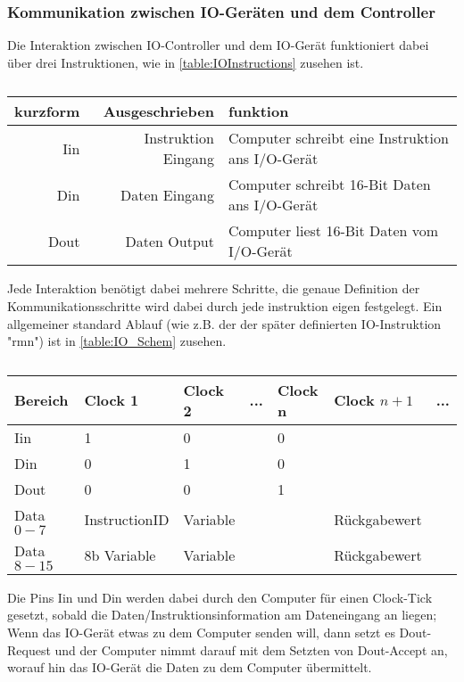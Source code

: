 \documentclass{scrartcl}
\begin{document}
\subsubsection{\label{section:IO-Port}Kommunikation zwischen IO-Geräten und dem Controller}
Die Interaktion zwischen IO-Controller und dem IO-Gerät funktioniert dabei über drei Instruktionen, wie in \autoref{table:IOInstructions} zusehen ist.

\begin{center}
	\begin{table}[h]
		\caption{\label{table:IOInstructions}}
		\begin{tabular}{r | r | l}
			kurzform & Ausgeschrieben & funktion \\
			\hline
			Iin & Instruktion Eingang & Computer schreibt eine Instruktion ans I/O-Gerät \\
			Din & Daten Eingang & Computer schreibt 16-Bit Daten ans I/O-Gerät \\
			Dout &  Daten Output & Computer liest 16-Bit Daten vom I/O-Gerät
 		\end{tabular}
	\end{table}
\end{center}

Jede Interaktion benötigt dabei mehrere Schritte, die genaue Definition der Kommunikationsschritte wird dabei durch jede instruktion eigen festgelegt.
Ein allgemeiner standard Ablauf (wie z.B. der der später definierten IO-Instruktion "rmn") ist in \autoref{table:IO_Schem} zusehen.

\begin{center}
	\begin{table}[h]
		\caption{\label{table:IO_Schem}}
		\begin{tabular}{l | l | l | l | l | l | l}
			 Bereich & Clock 1 & Clock 2 & ... & Clock n & Clock $n+1$ & ... \\
			\hline
			Iin & 1 & 0 &   & 0 & \\
			Din & 0 & 1 &   & 0 & \\
			Dout & 0 & 0 &   & 1 & \\
			Data$0-7$ & InstructionID & Variable &   &   & Rückgabewert \\
			Data$8-15$ & 8b Variable & Variable &   &   & Rückgabewert
 		\end{tabular}
	\end{table}
\end{center}

Die Pins Iin und Din werden dabei durch den Computer für einen Clock-Tick gesetzt, sobald die Daten/Instruktionsinformation am Dateneingang an liegen;
Wenn das IO-Gerät etwas zu dem Computer senden will, dann setzt es Dout-Request und der Computer nimmt darauf mit dem Setzten von Dout-Accept an, worauf hin das IO-Gerät die Daten zu dem Computer übermittelt.
\end{document}

